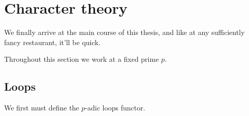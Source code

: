 \section{Character theory}
\label{char}

We finally arrive at the main course of this thesis, and like at any
sufficiently fancy restaurant, it'll be quick.

\begin{notation}
  \label{char-fixp}
  Throughout this section we work at a fixed prime $p$.
\end{notation}


\subsection{Loops}
\label{char-loops}

We first must define the $p$-adic loops functor.